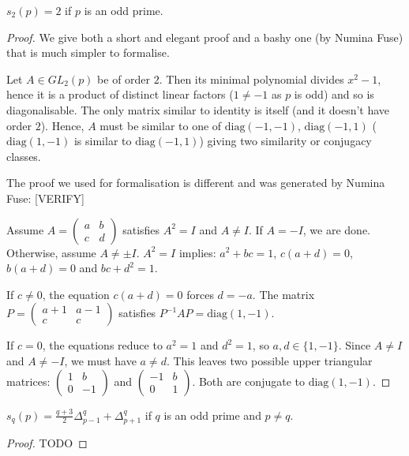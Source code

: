 \begin{lemma}
    $s_2(p) = 2$ if $p$ is an odd prime.
\end{lemma}
\begin{proof}
    We give both a short and elegant proof and a bashy one (by Numina Fuse) that is much simpler to formalise.

    Let $A \in GL_2(p)$ be of order $2$. Then its minimal polynomial divides $x^2 - 1$, hence it is a product of distinct linear factors ($1 \neq -1$ as $p$ is odd) and so is diagonalisable. The only matrix similar to identity is itself (and it doesn't have order $2$). Hence, $A$ must be similar to one of $\text{diag}(-1, -1)$, $\text{diag}(-1, 1)$ ($\text{diag}(1, -1)$ is similar to $\text{diag}(-1, 1)$) giving two similarity or conjugacy classes.

    The proof we used for formalisation is different and was generated  by Numina Fuse:
    [VERIFY]
    
    Assume $A = \begin{pmatrix} a & b \\ c & d \end{pmatrix}$ satisfies $A^2 = I$ and $A \neq I$. If $A = -I$, we are done. Otherwise, assume $A \neq \pm I$. $A^2 = I$ implies: $a^2 + bc = 1$, $c(a + d) = 0$, $b(a + d) = 0$ and $bc + d^2 = 1$. 

    If $c \neq 0$, the equation $c(a + d) = 0$ forces $d = -a$. The matrix $P = \begin{pmatrix} a+1 & a-1 \\ c & c \end{pmatrix}$ satisfies $P^{-1}AP = \text{diag}(1, -1)$.

    If $c = 0$, the equations reduce to $a^2 = 1$ and $d^2 = 1$, so $a, d \in \{1, -1\}$. Since $A \neq I$ and $A \neq -I$, we must have $a \neq d$. This leaves two possible upper triangular matrices: $\begin{pmatrix} 1 & b \\ 0 & -1 \end{pmatrix}$ and $\begin{pmatrix} -1 & b \\ 0 & 1 \end{pmatrix}$. Both are conjugate to $\text{diag}(1, -1)$.
\end{proof}

\begin{lemma}
    $s_q(p) = \frac{q+3}{2} \Delta^q_{p-1} + \Delta^q_{p+1}$ if $q$ is an odd prime and $p \neq q$.
\end{lemma}
\begin{proof}
    TODO
\end{proof}

